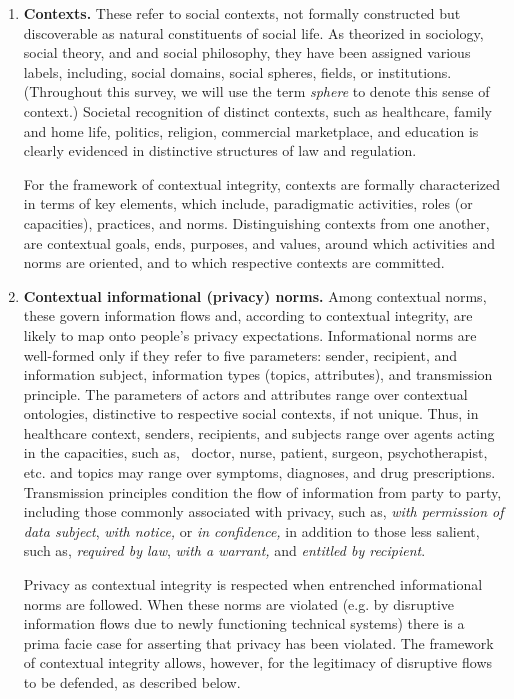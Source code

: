 \documentclass[../thesis.tex]{subfiles}
\begin{document}
\begin{enumerate}

\item \textbf{Contexts.} These refer to social contexts, not formally
constructed but discoverable as natural constituents of social life.
As theorized in sociology, social theory, and and social philosophy,
they have been assigned various labels, including, social domains,
social spheres, fields, or institutions. (Throughout this survey, we
will use the term \textit{sphere} to denote this sense of context.)
Societal recognition of distinct contexts, such as healthcare, family
and home life, politics, religion, commercial marketplace, and
education is clearly evidenced in distinctive structures of law and
regulation. 

For the framework of contextual integrity, contexts are formally
characterized in terms of key elements, which include, paradigmatic
activities, roles (or capacities), practices, and norms.
Distinguishing contexts from one another, are contextual goals, ends,
purposes, and values, around which activities and norms are oriented,
and to which respective contexts are committed.


\item \textbf{Contextual informational (privacy) norms.} Among
contextual norms, these govern information flows and, according to
contextual integrity, are likely to map onto people's
privacy expectations. Informational norms are well-formed only if
they refer to five parameters: sender, recipient, and information
subject, information types (topics, attributes), and transmission
principle. The parameters of actors and attributes range over
contextual ontologies, distinctive to respective social contexts, if
not unique. Thus, in healthcare context, senders, recipients, and
subjects range over agents acting in the capacities, such as,
\ doctor, nurse, patient, surgeon, psychotherapist, etc. and
topics may range over symptoms, diagnoses, and drug
prescriptions. Transmission principles condition the flow of
information from party to party, including those commonly associated
with privacy, such as, \textit{with permission of data subject},
\textit{with notice,} or \textit{in confidence, }in addition to those
less salient, such as, \textit{required by law}, \textit{with a
warrant,} and \textit{entitled by recipient}.

Privacy as contextual integrity is respected when entrenched
informational norms are followed. When these norms are violated (e.g.
by disruptive information flows due to newly functioning technical
systems) there is a prima facie case for asserting that privacy has
been violated. The framework of contextual integrity allows, however,
for the legitimacy of disruptive flows to be defended, as described
below. 



\end{enumerate}
\end{document}
